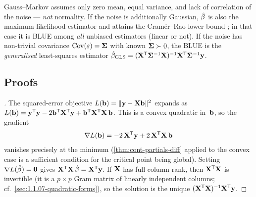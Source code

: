 \begin{remark}
Gauss–Markov assumes only zero mean, equal variance, and lack of
correlation of the noise — \emph{not} normality. If the noise is
additionally Gaussian, $\hat{\mathbf{\beta}}$ is also the maximum
likelihood estimator and attains the Cramér–Rao lower bound
\cite[Ch.~VII, \S~6]{Shiryaev1989}; in that case it is BLUE among
\emph{all} unbiased estimators (linear or not). If the noise has
non-trivial covariance $\operatorname{Cov}(\mathbf{\varepsilon}) = \mathbf{\Sigma}$
with known $\mathbf{\Sigma} \succ 0$, the BLUE is the
\emph{generalised} least-squares estimator
$\hat{\mathbf{\beta}}_{\mathrm{GLS}} = (\mathbf{X}^{\mathsf{T}} \mathbf{\Sigma}^{-1} \mathbf{X})^{-1} \mathbf{X}^{\mathsf{T}} \mathbf{\Sigma}^{-1} \mathbf{y}$.
\end{remark}

\subsection*{Proofs}

\begin{proof}[]
The squared-error objective $L(\mathbf{b}) = \|\mathbf{y} - \mathbf{X} \mathbf{b}\|^2$
expands as
$L(\mathbf{b}) = \mathbf{y}^{\mathsf{T}} \mathbf{y} - 2 \mathbf{b}^{\mathsf{T}} \mathbf{X}^{\mathsf{T}} \mathbf{y} + \mathbf{b}^{\mathsf{T}} \mathbf{X}^{\mathsf{T}} \mathbf{X}\, \mathbf{b}$.
This is a convex quadratic in~$\mathbf{b}$, so the gradient
\[
  \nabla L(\mathbf{b}) = -2\, \mathbf{X}^{\mathsf{T}} \mathbf{y} + 2\, \mathbf{X}^{\mathsf{T}} \mathbf{X}\, \mathbf{b}
\]
vanishes precisely at the minimum (\cref{thm:cont-partials-diff}
applied to the convex case is a sufficient condition for the
critical point being global). Setting $\nabla L(\hat{\mathbf{\beta}}) = \mathbf{0}$
gives $\mathbf{X}^{\mathsf{T}} \mathbf{X}\, \hat{\mathbf{\beta}} = \mathbf{X}^{\mathsf{T}} \mathbf{y}$.
If $\mathbf{X}$ has full column rank, then $\mathbf{X}^{\mathsf{T}} \mathbf{X}$ is
invertible (it is a $p \times p$ Gram matrix of linearly independent
columns; cf.\ \cref{sec:1.1.07-quadratic-forms}), so the solution
is the unique $(\mathbf{X}^{\mathsf{T}} \mathbf{X})^{-1} \mathbf{X}^{\mathsf{T}} \mathbf{y}$.
\end{proof}

